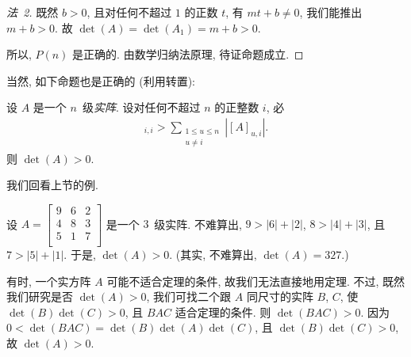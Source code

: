 \begin{proof}[法~2]
    既然 \(b > 0\),
    且对任何不超过 \(1\) 的正数 \(t\),
    有 \(mt + b \neq 0\),
    我们能推出 \(m + b > 0\).
    故 \(\det {(A)} = \det {(A_1)} = m + b > 0\).

    所以, \(P(n)\) 是正确的.
    由数学归纳法原理, 待证命题成立.
\end{proof}

当然, 如下命题也是正确的 (利用转置):

\begin{theorem}
    设 \(A\) 是一个 \(n\)~级\emph{实阵}.
    设对任何不超过 \(n\) 的正整数 \(i\), 必
    \begin{align*}
        [A]_{i,i} >
        \sum_{\substack{1 \leq u \leq n \\
            u \neq i}} {|[A]_{u,i}|}.
    \end{align*}
    则 \(\det {(A)} > 0\).
\end{theorem}

\begingroup

我们回看上节的例.

\renewcommand\thmcontinues[1]{续}

\begin{example}[continues=emp:NonzeroDet1]
    设 \(A =
    \begin{bmatrix}
        9 & 6 & 2 \\
        4 & 8 & 3 \\
        5 & 1 & 7 \\
    \end{bmatrix}\)
    是一个 \(3\)~级实阵.
    不难算出, \(9 > |6| + |2|\),
    \(8 > |4| + |3|\),
    且 \(7 > |5| + |1|\).
    于是, \(\det {(A)} > 0\).
    (其实, 不难算出, \(\det {(A)} = 327.\))
\end{example}

有时, 一个实方阵 \(A\) 可能不适合定理的条件, 故我们无法直接地用定理.
不过, 既然我们研究是否 \(\det {(A)} > 0\),
我们可找二个跟 \(A\) 同尺寸的实阵 \(B\), \(C\),
使 \(\det {(B)} \det {(C)} > 0\),
且 \(BAC\) 适合定理的条件.
则 \(\det {(BAC)} > 0\).
因为 \(0 < \det {(BAC)} = \det {(B)} \det {(A)} \det {(C)}\),
且 \(\det {(B)} \det {(C)} > 0\),
故 \(\det {(A)} > 0\).

